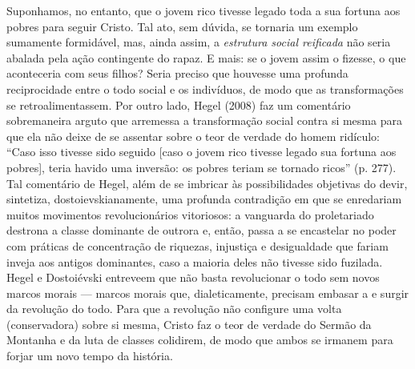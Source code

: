 Suponhamos, no entanto, que o jovem rico tivesse legado toda a sua
fortuna aos pobres para seguir Cristo. Tal ato, sem dúvida, se tornaria
um exemplo sumamente formidável, mas, ainda assim, a \emph{estrutura
social reificada} não seria abalada pela ação contingente do rapaz. E
mais: se o jovem assim o fizesse, o que aconteceria com seus filhos?
Seria preciso que houvesse uma profunda reciprocidade entre o todo
social e os indivíduos, de modo que as transformações se
retroalimentassem. Por outro lado, Hegel (2008) faz um comentário
sobremaneira arguto que arremessa a transformação social contra si mesma
para que ela não deixe de se assentar sobre o teor de verdade do homem
ridículo: ``Caso isso tivesse sido seguido {[}caso o jovem rico tivesse
legado sua fortuna aos pobres{]}, teria havido uma inversão: os pobres
teriam se tornado ricos'' (p. 277). Tal comentário de Hegel, além de se
imbricar às possibilidades objetivas do devir, sintetiza,
dostoievskianamente, uma profunda contradição em que se enredariam
muitos movimentos revolucionários vitoriosos: a vanguarda do
proletariado destrona a classe dominante de outrora e, então, passa a se
encastelar no poder com práticas de concentração de riquezas, injustiça
e desigualdade que fariam inveja aos antigos dominantes, caso a maioria
deles não tivesse sido fuzilada. Hegel e Dostoiévski entreveem que não
basta revolucionar o todo sem novos marcos morais --- marcos morais que,
dialeticamente, precisam embasar a e surgir da revolução do todo. Para
que a revolução não configure uma volta (conservadora) sobre si mesma,
Cristo faz o teor de verdade do Sermão da Montanha e da luta de classes
colidirem, de modo que ambos se irmanem para forjar um novo tempo da
história.

